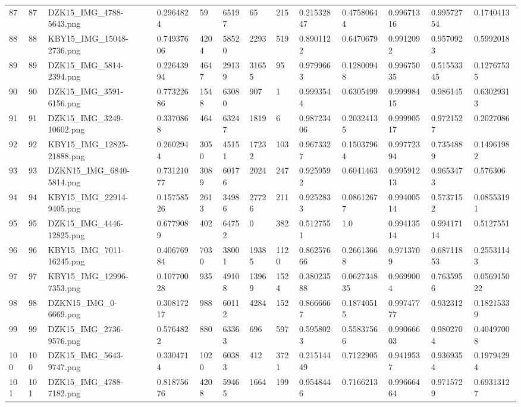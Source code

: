 \documentclass[11pt, a4paper, twoside]{report}
\begin{document}
\begin{longtable}[c]{@{}lllllllllllll@{}}
87 & 87 & DZK15\_IMG\_4788-5643.png & 0.2964824 & 59 & 65197 & 65 & 215 & 0.21532847 & 0.47580644 & 0.99671316 & 0.99572754 & 0.1740413 \\
88 & 88 & KBY15\_IMG\_15048-2736.png & 0.74937606 & 4204 & 58520 & 2293 & 519 & 0.8901122 & 0.6470679 & 0.9912092 & 0.9570923 & 0.5992018 \\
89 & 89 & DZK15\_IMG\_5814-2394.png & 0.22643994 & 4647 & 29139 & 31655 & 95 & 0.9799663 & 0.12800948 & 0.99675035 & 0.51553345 & 0.12767535 \\
90 & 90 & DZK15\_IMG\_3591-6156.png & 0.77322686 & 1548 & 63080 & 907 & 1 & 0.9993544 & 0.6305499 & 0.99998415 & 0.986145 & 0.63029313 \\
91 & 91 & DZK15\_IMG\_3249-10602.png & 0.3370868 & 464 & 63247 & 1819 & 6 & 0.98723406 & 0.20324135 & 0.99990517 & 0.9721527 & 0.2027086 \\
92 & 92 & KBY15\_IMG\_12825-21888.png & 0.2602944 & 3050 & 45151 & 17232 & 103 & 0.9673327 & 0.15037964 & 0.99772394 & 0.7354889 & 0.14961982 \\
93 & 93 & DZKN15\_IMG\_6840-5814.png & 0.73121077 & 3089 & 60176 & 2024 & 247 & 0.9259592 & 0.6041463 & 0.99591213 & 0.9653473 & 0.576306 \\
94 & 94 & KBY15\_IMG\_22914-9405.png & 0.15758526 & 2613 & 34986 & 27726 & 211 & 0.9252833 & 0.08612677 & 0.99400514 & 0.5737152 & 0.08553191 \\
95 & 95 & DZK15\_IMG\_4446-12825.png & 0.6779089 & 402 & 64752 & 0 & 382 & 0.5127551 & 1.0 & 0.99413514 & 0.99417114 & 0.5127551 \\
96 & 96 & KBY15\_IMG\_7011-16245.png & 0.40676984 & 7030 & 38001 & 19385 & 1120 & 0.86257666 & 0.26613668 & 0.9713709 & 0.68711853 & 0.25531143 \\
97 & 97 & KBY15\_IMG\_12996-7353.png & 0.10770028 & 935 & 49108 & 13969 & 1524 & 0.38023588 & 0.062734835 & 0.9699004 & 0.7635956 & 0.056915022 \\
98 & 98 & DZKN15\_IMG\_0-6669.png & 0.30817217 & 988 & 60112 & 4284 & 152 & 0.8666667 & 0.18740515 & 0.99747777 & 0.932312 & 0.18215339 \\
99 & 99 & DZK15\_IMG\_2736-9576.png & 0.5764822 & 880 & 63363 & 696 & 597 & 0.5958023 & 0.55837566 & 0.99066603 & 0.9802704 & 0.40497008 \\
100 & 100 & DZK15\_IMG\_5643-9747.png & 0.3304714 & 1020 & 60383 & 412 & 3721 & 0.21514449 & 0.7122905 & 0.9419537 & 0.9369354 & 0.19794294 \\
101 & 101 & DZK15\_IMG\_4788-7182.png & 0.81875676 & 4208 & 59465 & 1664 & 199 & 0.9548446 & 0.7166213 & 0.99666464 & 0.9715729 & 0.69313127 \\

\end{longtable}
\end{document}
